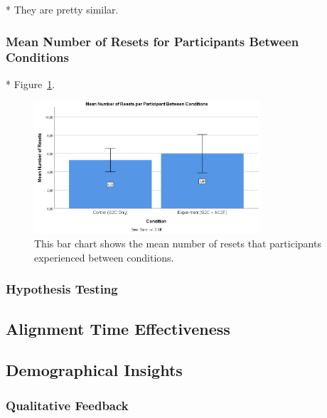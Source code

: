 * They are pretty similar.

\subsubsection{Mean Number of Resets for Participants Between Conditions}
* Figure~\ref{fig:ex2resetMeans}.
\begin{figure}[tbph]
    \centering
    \includegraphics[width=0.75\textwidth]{figures/graphs/ResetMeans.png}
    \caption[Mean Number of Resets Between Conditions]{This bar chart shows the mean number of resets that participants experienced between conditions.}
    \label{fig:ex2resetMeans}
\end{figure}

\subsubsection{Hypothesis Testing}

\subsection{Alignment Time Effectiveness}

\subsection{Demographical Insights}

\subsubsection{Qualitative Feedback}